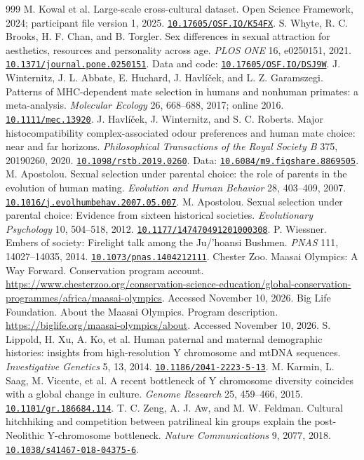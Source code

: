 \documentclass[10pt,twocolumn,letterpaper]{article}
\newcommand{\doi}[1]{\href{https://doi.org/#1}{\nolinkurl{#1}}}
\begin{document}
\begin{thebibliography}{999}
 M. Kowal et al. Large-scale cross-cultural dataset. Open Science Framework, 2024; participant file version 1, 2025. \doi{10.17605/OSF.IO/K54FX}.
 S. Whyte, R. C. Brooks, H. F. Chan, and B. Torgler. Sex differences in sexual attraction for aesthetics, resources and personality across age. \emph{PLOS ONE} 16, e0250151, 2021. \doi{10.1371/journal.pone.0250151}. Data and code: \doi{10.17605/OSF.IO/DSJ9W}.
 J. Winternitz, J. L. Abbate, E. Huchard, J. Havl\'i\v{c}ek, and L. Z. Garamszegi. Patterns of MHC-dependent mate selection in humans and nonhuman primates: a meta-analysis. \emph{Molecular Ecology} 26, 668--688, 2017; online 2016. \doi{10.1111/mec.13920}.
 J. Havl\'i\v{c}ek, J. Winternitz, and S. C. Roberts. Major histocompatibility complex-associated odour preferences and human mate choice: near and far horizons. \emph{Philosophical Transactions of the Royal Society B} 375, 20190260, 2020. \doi{10.1098/rstb.2019.0260}. Data: \doi{10.6084/m9.figshare.8869505}.
 M. Apostolou. Sexual selection under parental choice: the role of parents in the evolution of human mating. \emph{Evolution and Human Behavior} 28, 403--409, 2007. \doi{10.1016/j.evolhumbehav.2007.05.007}.
 M. Apostolou. Sexual selection under parental choice: Evidence from sixteen historical societies. \emph{Evolutionary Psychology} 10, 504--518, 2012. \doi{10.1177/147470491201000308}.
 P. Wiessner. Embers of society: Firelight talk among the Ju/'hoansi Bushmen. \emph{PNAS} 111, 14027--14035, 2014. \doi{10.1073/pnas.1404212111}.
 Chester Zoo. Maasai Olympics: A Way Forward. Conservation program account. \url{https://www.chesterzoo.org/conservation-science-education/global-conservation-programmes/africa/maasai-olympics}. Accessed November 10, 2026.
 Big Life Foundation. About the Maasai Olympics. Program description. \url{https://biglife.org/maasai-olympics/about}. Accessed November 10, 2026.
 S. Lippold, H. Xu, A. Ko, et al. Human paternal and maternal demographic histories: insights from high-resolution Y chromosome and mtDNA sequences. \emph{Investigative Genetics} 5, 13, 2014. \doi{10.1186/2041-2223-5-13}.
 M. Karmin, L. Saag, M. Vicente, et al. A recent bottleneck of Y chromosome diversity coincides with a global change in culture. \emph{Genome Research} 25, 459--466, 2015. \doi{10.1101/gr.186684.114}.
 T. C. Zeng, A. J. Aw, and M. W. Feldman. Cultural hitchhiking and competition between patrilineal kin groups explain the post-Neolithic Y-chromosome bottleneck. \emph{Nature Communications} 9, 2077, 2018. \doi{10.1038/s41467-018-04375-6}.

\end{thebibliography}
\end{document}
